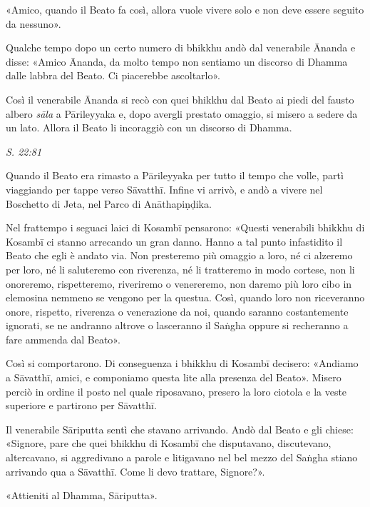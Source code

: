 «Amico, quando il Beato fa così, allora vuole vivere solo e non deve
essere seguito da nessuno».


Qualche tempo dopo un certo numero di bhikkhu andò dal venerabile Ānanda
e disse: «Amico Ānanda, da molto tempo non sentiamo un discorso di
Dhamma dalle labbra del Beato. Ci piacerebbe ascoltarlo».


Così il venerabile Ānanda si recò con quei bhikkhu dal Beato ai piedi
del fausto albero \emph{sāla} a Pārileyyaka e, dopo avergli prestato omaggio,
si misero a sedere da un lato. Allora il Beato li incoraggiò con un
discorso di Dhamma.


\emph{S. 22:81}


 Quando il Beato era rimasto a Pārileyyaka per tutto il
tempo che volle, partì viaggiando per tappe verso Sāvatthī. Infine vi
arrivò, e andò a vivere nel Boschetto di Jeta, nel Parco di
Anāthapiṇḍika.


Nel frattempo i seguaci laici di Kosambī pensarono: «Questi venerabili
bhikkhu di Kosambī ci stanno arrecando un gran danno. Hanno a tal punto
infastidito il Beato che egli è andato via. Non presteremo più omaggio a
loro, né ci alzeremo per loro, né li saluteremo con riverenza, né li
tratteremo in modo cortese, non li onoreremo, rispetteremo, riveriremo o
venereremo, non daremo più loro cibo in elemosina nemmeno se vengono per
la questua. Così, quando loro non riceveranno onore, rispetto, riverenza
o venerazione da noi, quando saranno costantemente ignorati, se ne
andranno altrove o lasceranno il Saṅgha oppure si recheranno a fare
ammenda dal Beato».


Così si comportarono. Di conseguenza i bhikkhu di Kosambī decisero:
«Andiamo a Sāvatthī, amici, e componiamo questa lite alla presenza del
Beato». Misero perciò in ordine il posto nel quale riposavano, presero
la loro ciotola e la veste superiore e partirono per Sāvatthī.


Il venerabile Sāriputta sentì che stavano arrivando. Andò dal Beato e
gli chiese: «Signore, pare che quei bhikkhu di Kosambī che disputavano,
discutevano, altercavano, si aggredivano a parole e litigavano nel bel
mezzo del Saṅgha stiano arrivando qua a Sāvatthī. Come li devo trattare,
Signore?».


«Attieniti al Dhamma, Sāriputta».


